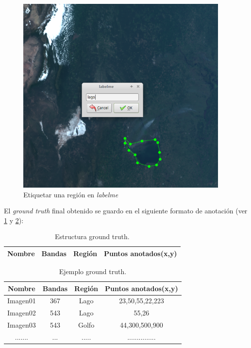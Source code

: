 \begin{figure}[H]
 \centering
  \includegraphics[height=10cm,keepaspectratio=true,clip=true]{imagenes/Logos/labelme2.png}
  \caption{Etiquetar una región en \textit{labelme}}
	\label{Fig: labelme2}
\end{figure}

El \textit{ground truth} final obtenido se guardo en el siguiente formato de anotación (ver \ref{tab:GT} y \ref{tab:ejemGT}):

\begin{table}[H]
\begin{center}
\begin{tabular}{|c|c|c|c|}
\hline Nombre & Bandas & Región & Puntos anotados(x,y)\\ \hline 
\end{tabular}
\end{center} \caption{Estructura ground truth.}\label{tab:GT}
\end{table}

\begin{table}[H]
\begin{center}
\begin{tabular}{|c|c|c|c|}
\hline \textbf{Nombre} & \textbf{Bandas} & \textbf{Región} & \textbf{Puntos anotados(x,y)}\\ \hline 
Imagen01 & 367 & Lago  & 23,50,55,22,223\\ \hline 
Imagen02 & 543 & Lago  & 55,26		\\ \hline 
Imagen03 & 543 & Golfo & 44,300,500,900 \\ \hline 
.......  & ...  & .....& ...............\\ \hline 
\end{tabular}
\end{center} \caption{Ejemplo ground truth.}\label{tab:ejemGT}
\end{table}


